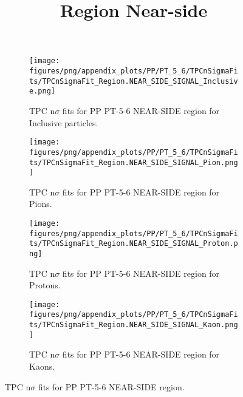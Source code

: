             \begin{figure}[H]
                \title{Region Near-side}
                \begin{subfigure}[b]{0.5\textwidth}
                    \centering
                    \texttt{[image: figures/png/appendix\_plots/PP/PT\_5\_6/TPCnSigmaFits/TPCnSigmaFit\_Region.NEAR\_SIDE\_SIGNAL\_Inclusive.png]}
                    \caption{TPC n$\sigma$ fits for PP PT-5-6 NEAR-SIDE region for Inclusive particles.}
                    \label{fig:appendix_PP_PT-5-6_NEAR_SIDE_SIGNAL_Inclusive}
                \end{subfigure}
                \begin{subfigure}[b]{0.5\textwidth}
                    \centering
                    \texttt{[image: figures/png/appendix\_plots/PP/PT\_5\_6/TPCnSigmaFits/TPCnSigmaFit\_Region.NEAR\_SIDE\_SIGNAL\_Pion.png]}
                    \caption{TPC n$\sigma$ fits for PP PT-5-6 NEAR-SIDE region for Pions.}
                    \label{fig:appendix_PP_PT-5-6_NEAR_SIDE_SIGNAL_Pion}
                \end{subfigure}
                \begin{subfigure}[b]{0.5\textwidth}
                    \centering
                    \texttt{[image: figures/png/appendix\_plots/PP/PT\_5\_6/TPCnSigmaFits/TPCnSigmaFit\_Region.NEAR\_SIDE\_SIGNAL\_Proton.png]}
                    \caption{TPC n$\sigma$ fits for PP PT-5-6 NEAR-SIDE region for Protons.}
                    \label{fig:appendix_PP_PT-5-6_NEAR_SIDE_SIGNAL_Proton}
                \end{subfigure}
                \begin{subfigure}[b]{0.5\textwidth}
                    \centering
                    \texttt{[image: figures/png/appendix\_plots/PP/PT\_5\_6/TPCnSigmaFits/TPCnSigmaFit\_Region.NEAR\_SIDE\_SIGNAL\_Kaon.png]}
                    \caption{TPC n$\sigma$ fits for PP PT-5-6 NEAR-SIDE region for Kaons.}
                    \label{fig:appendix_PP_PT-5-6_NEAR_SIDE_SIGNAL_Kaon}
                \end{subfigure}
                \caption{TPC n$\sigma$ fits for PP PT-5-6 NEAR-SIDE region.}
                \label{fig:appendix_PP_PT-5-6_NEAR_SIDE_SIGNAL}
            \end{figure}
